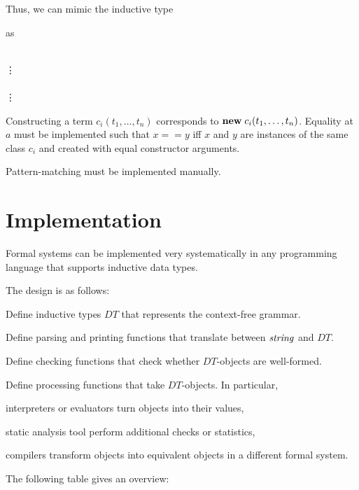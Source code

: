 Thus, we can mimic the inductive type
\begin{acode}
\end{acode}
as
\begin{acode}
\\
\vdots \\
\\
\vdots
\end{acode}

Constructing a term $c_i(t_1,\ldots,t_n)$ corresponds to ${\rm \bf new}\; c_i(t_1,\ldots,t_n)$.
Equality at $a$ must be implemented such that $x==y$ iff $x$ and $y$ are instances of the same class $c_i$ and created with equal constructor arguments.

Pattern-matching must be implemented manually.

\section{Implementation}

Formal systems can be implemented very systematically in any programming language that supports inductive data types.

The design is as follows:
\begin{compactenum}
 \item Define inductive types $DT$ that represents the context-free grammar.
 \item Define parsing and printing functions that translate between $\mathit{string}$ and $DT$.
 \item Define checking functions that check whether $DT$-objects are well-formed.
 \item Define processing functions that take $DT$-objects. In particular,
  \begin{compactitem}
   \item interpreters or evaluators turn objects into their values,
   \item static analysis tool perform additional checks or statistics,
   \item compilers transform objects into equivalent objects in a different formal system.
  \end{compactitem}
\end{compactenum}

The following table gives an overview:

